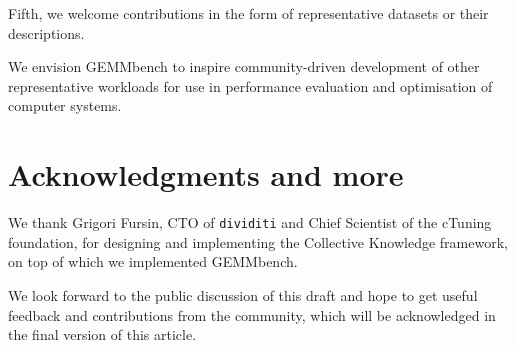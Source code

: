 \documentclass{acm_proc_article-sp} %
\begin{document}
Fifth, we welcome contributions in the form of representative datasets or
their descriptions.

We envision GEMMbench to inspire community-driven development of other
representative workloads for use in performance evaluation and optimisation of
computer systems.

\section*{Acknowledgments and more}

We thank Grigori Fursin, CTO of {\tt dividiti} and Chief Scientist of the
cTuning foundation, for designing and implementing the Collective
Knowledge framework, on top of which we implemented GEMMbench.

We look forward to the public discussion of this draft and hope to get useful
feedback and contributions from the community, which will be acknowledged in
the final version of this article.





\balancecolumns
\end{document}
